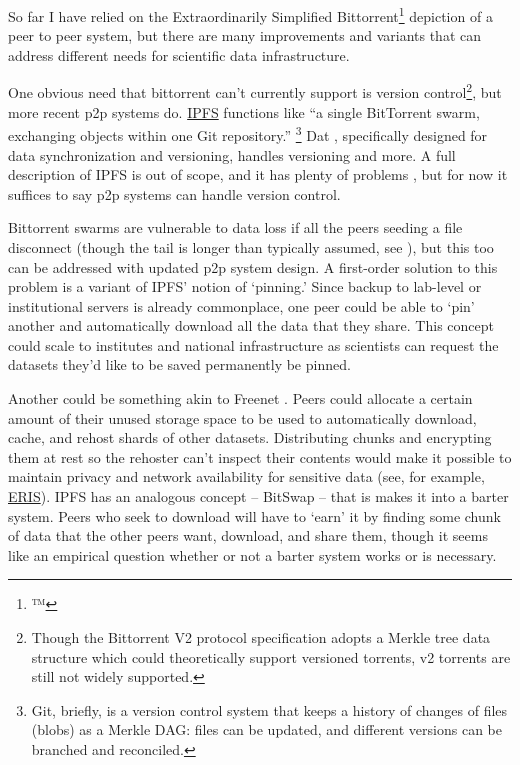 So far I have relied on the Extraordinarily Simplified
Bittorrent\footnote{™️} depiction of a peer to peer system, but there
are many improvements and variants that can address different needs for
scientific data infrastructure.

One obvious need that bittorrent can't currently support is version
control\footnote{Though the Bittorrent V2 protocol specification \citep{cohenBEP52BitTorrent2017}  adopts a Merkle tree data structure
  which could theoretically support versioned torrents, v2 torrents are
  still not widely supported.}, but more recent p2p systems do.
\href{https://ipfs.io/}{IPFS} functions like ``a single BitTorrent
swarm, exchanging objects within one Git repository.'' \citep{benetIPFSContentAddressed2014} \footnote{Git, briefly, is a version
  control system that keeps a history of changes of files (blobs) as a
  Merkle DAG: files can be updated, and different versions can be
  branched and reconciled.} Dat \citep{ogdenDatDistributedDataset2017} , specifically designed for data synchronization and versioning,
handles versioning and more. A full description of IPFS is out of scope,
and it has plenty of problems \citep{patsakisHydrasIPFSDecentralised2019} , but for now it suffices to say
p2p systems can handle version control.

Bittorrent swarms are vulnerable to data loss if all the peers seeding a
file disconnect (though the tail is longer than typically assumed, see
\citep{zhangUnravelingBitTorrentEcosystem2011} ), but this too can
be addressed with updated p2p system design. A first-order solution to
this problem is a variant of IPFS' notion of `pinning.' Since backup to
lab-level or institutional servers is already commonplace, one peer
could be able to `pin' another and automatically download all the data
that they share. This concept could scale to institutes and national
infrastructure as scientists can request the datasets they'd like to be
saved permanently be pinned.

Another could be something akin to Freenet \citep{clarkeFreenetDistributedAnonymous2001} . Peers could allocate a
certain amount of their unused storage space to be used to automatically
download, cache, and rehost shards of other datasets. Distributing
chunks and encrypting them at rest so the rehoster can't inspect their
contents would make it possible to maintain privacy and network
availability for sensitive data (see, for example,
\href{https://inqlab.net/projects/eris/}{ERIS}). IPFS has an analogous
concept -- BitSwap -- that is makes it into a barter system. Peers who
seek to download will have to `earn' it by finding some chunk of data
that the other peers want, download, and share them, though it seems
like an empirical question whether or not a barter system works or is
necessary.

